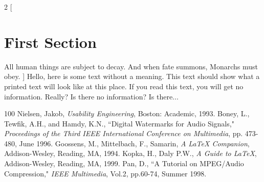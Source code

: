 \documentclass[11pt]{article}
\begin{document}
\begin{multicols}{2}
[
\section{First Section}
All human things are subject to decay. And when fate summons, Monarchs must obey.
]
Hello, here is some text without a meaning.  This text should show what 
a printed text will look like at this place.
If you read this text, you will get no information.  Really?  Is there 
no information?  Is there...
\end{multicols}
\clearpage
\begin{thebibliography}{100} %
 Nielsen, Jakob, \emph{Usability Engineering}, Boston: Academic, 1993.
 Boney, L., Tewfik, A.H., and Hamdy, K.N., ``Digital 
Watermarks for Audio Signals," \emph{Proceedings of the Third IEEE 
International Conference on Multimedia}, pp. 473-480, June 1996.
 Goossens, M., Mittelbach, F., Samarin, \emph{A LaTeX 
Companion}, Addison-Wesley, Reading, MA, 1994.
 Kopka, H., Daly P.W., \emph{A Guide to LaTeX},
Addison-Wesley, Reading, MA, 1999.
 Pan, D., ``A Tutorial on MPEG/Audio Compression," \emph{IEEE 
Multimedia}, Vol.2, pp.60-74, Summer 1998.
\end{thebibliography}
\end{document}
